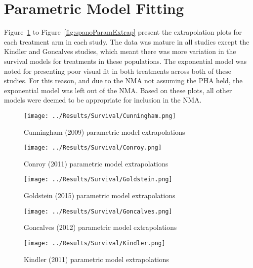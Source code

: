\section{Parametric Model Fitting}

Figure~\ref{fig:cunninghamParamExtrap} to Figure~\ref{fig:spanoParamExtrap} present the extrapolation plots for each treatment arm in each study. The data was mature in all studies except the Kindler and Goncalves studies, which meant there was more variation in the survival models for treatments in these populations. The exponential model was noted for presenting poor visual fit in both treatments across both of these studies. For this reason, and due to the NMA not assuming the PHA held, the exponential model was left out of the NMA. Based on these plots, all other models were deemed to be appropriate for inclusion in the NMA. \\



\begin{figure}[h]
    \centering
    \texttt{[image: ../Results/Survival/Cunningham.png]}
    \caption{Cunningham (2009) parametric model extrapolations}
    \label{fig:cunninghamParamExtrap}
\end{figure}

\begin{figure}[h]
    \centering
    \texttt{[image: ../Results/Survival/Conroy.png]}
    \caption{Conroy (2011) parametric model extrapolations}
    \label{fig:conroyParamExtrap}
\end{figure}

\begin{figure}[h]
    \centering
    \texttt{[image: ../Results/Survival/Goldstein.png]}
    \caption{Goldstein (2015) parametric model extrapolations}
    \label{fig:goldsteinParamExtrap}
\end{figure}

\begin{figure}[h]
    \centering
    \texttt{[image: ../Results/Survival/Goncalves.png]}
    \caption{Goncalves (2012) parametric model extrapolations}
    \label{fig:goncalvesParamExtrap}
\end{figure}

\begin{figure}[h]
    \centering
    \texttt{[image: ../Results/Survival/Kindler.png]}
    \caption{Kindler (2011) parametric model extrapolations}
    \label{fig:kindlerParamExtrap}
\end{figure}

